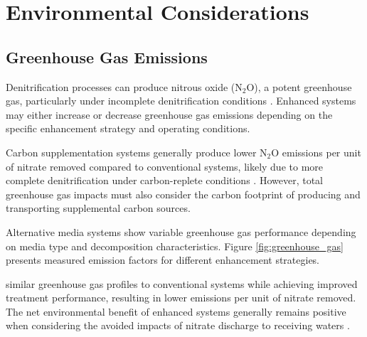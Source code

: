 \documentclass[12pt,a4paper]{article}
\begin{document}
\section{Environmental Considerations}

\subsection{Greenhouse Gas Emissions}

 Denitrification processes can produce nitrous oxide (N$_2$O), a potent greenhouse gas, particularly under incomplete denitrification conditions \citep{RN611, RN708}. Enhanced systems may either increase or decrease greenhouse gas emissions depending on the specific enhancement strategy and operating conditions.

 Carbon supplementation systems generally produce lower N$_2$O emissions per unit of nitrate removed compared to conventional systems, likely due to more complete denitrification under carbon-replete conditions \citep{RN708}. However, total greenhouse gas impacts must also consider the carbon footprint of producing and transporting supplemental carbon sources.

Alternative media systems show variable greenhouse gas performance depending on media type and decomposition characteristics.  Figure \ref{fig:greenhouse_gas} presents measured emission factors for different enhancement strategies.

 similar greenhouse gas profiles to conventional systems while achieving improved treatment performance, resulting in lower emissions per unit of nitrate removed. The net environmental benefit of enhanced systems generally remains positive when considering the avoided impacts of nitrate discharge to receiving waters \citep{RN1181}.
\end{document}
